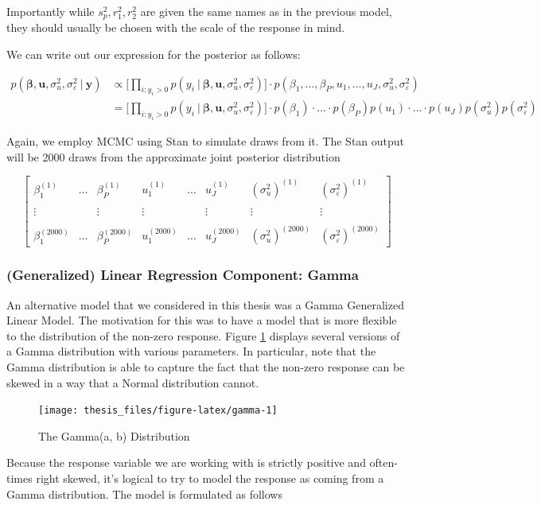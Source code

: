 \documentclass[12pt,twoside]{reedthesis}
\begin{document}
Importantly while \(s_p^2, r_1^2, r_2^2\) are given the same names as in the previous model, they should usually be chosen with the scale of the response in mind.

We can write out our expression for the posterior as follows:

\[
\begin{aligned}
p(\boldsymbol{\beta}, \boldsymbol{u}, \sigma_{u}^2, \sigma_{\varepsilon}^2 \ | \ \mathbf{y}) &\propto \bigg[\prod_{i:y_{i} > 0}p(y_{i} \ | \ \boldsymbol{\beta}, \mathbf{u}, \sigma_{u}^2, \sigma_{\varepsilon}^2)\bigg]\cdot p(\beta_1, ..., \beta_P, u_1, ..., u_J, \sigma_{u}^2, \sigma_{\varepsilon}^2) \\
 &=\bigg[\prod_{i:y_{i} > 0}p(y_{i} \ | \ \boldsymbol{\beta}, \mathbf{u},\sigma_{u}^2, \sigma_{\varepsilon}^2)\bigg]\cdot p(\beta_1)\cdot...\cdot p(\beta_P)p(u_1)\cdot ... \cdot p(u_J)p(\sigma_{u}^2)p( \sigma_{\varepsilon}^2) 
\end{aligned}
\]

Again, we employ MCMC using Stan to simulate draws from it. The Stan output will be 2000 draws from the approximate joint posterior distribution

\[
\begin{bmatrix}
  \beta_1^{(1)} & \dots & \beta_P^{(1)} & u_1^{(1)} & \dots & u_J^{(1)} & (\sigma_{u}^2)^{(1)} & (\sigma_{\varepsilon}^2)^{(1)} \\
  \\ \vdots &  & \vdots & \vdots & & \vdots & \vdots & \vdots \\ \\
  \beta_1^{(2000)} & \dots & \beta_P^{(2000)} & u_1^{(2000)} & \dots & u_J^{(2000)} & (\sigma_{u}^2)^{(2000)} & (\sigma_{\varepsilon}^2)^{(2000)}
\end{bmatrix}
\]

\hypertarget{generalized-linear-regression-component-gamma}{%
\subsubsection{(Generalized) Linear Regression Component: Gamma}\label{generalized-linear-regression-component-gamma}}

An alternative model that we considered in this thesis was a Gamma Generalized Linear Model. The motivation for this was to have a model that is more flexible to the distribution of the non-zero response. Figure \ref{fig:gamma} displays several versions of a Gamma distribution with various parameters. In particular, note that the Gamma distribution is able to capture the fact that the non-zero response can be skewed in a way that a Normal distribution cannot.
\begin{figure}

{\centering \texttt{[image: thesis\_files/figure-latex/gamma-1]} 

}

\caption{The Gamma(a, b) Distribution}\label{fig:gamma}
\end{figure}
Because the response variable we are working with is strictly positive and often-times right skewed, it's logical to try to model the response as coming from a Gamma distribution. The model is formulated as follows
\end{document}
